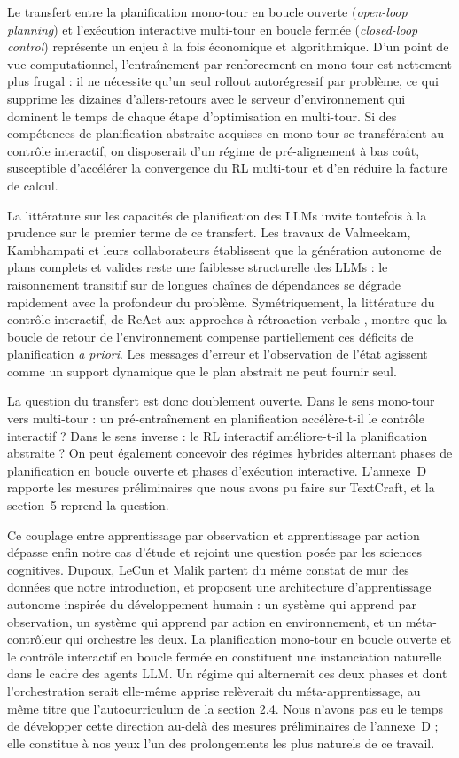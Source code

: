 \documentclass[11pt,a4paper]{article}
\begin{document}
Le transfert entre la planification mono-tour en boucle ouverte (\emph{open-loop planning}) et l'exécution interactive multi-tour en boucle fermée (\emph{closed-loop control}) représente un enjeu à la fois économique et algorithmique. D'un point de vue computationnel, l'entraînement par renforcement en mono-tour est nettement plus frugal : il ne nécessite qu'un seul rollout autorégressif par problème, ce qui supprime les dizaines d'allers-retours avec le serveur d'environnement qui dominent le temps de chaque étape d'optimisation en multi-tour. Si des compétences de planification abstraite acquises en mono-tour se transféraient au contrôle interactif, on disposerait d'un régime de pré-alignement à bas coût, susceptible d'accélérer la convergence du RL multi-tour et d'en réduire la facture de calcul.

La littérature sur les capacités de planification des LLMs invite toutefois à la prudence sur le premier terme de ce transfert. Les travaux de Valmeekam, Kambhampati et leurs collaborateurs \cite{valmeekam2023planning, kambhampati2024llmmodulo} établissent que la génération autonome de plans complets et valides reste une faiblesse structurelle des LLMs : le raisonnement transitif sur de longues chaînes de dépendances se dégrade rapidement avec la profondeur du problème. Symétriquement, la littérature du contrôle interactif, de ReAct \cite{yao2023react} aux approches à rétroaction verbale \cite{shinn2023reflexion}, montre que la boucle de retour de l'environnement compense partiellement ces déficits de planification \emph{a priori}. Les messages d'erreur et l'observation de l'état agissent comme un support dynamique que le plan abstrait ne peut fournir seul.

La question du transfert est donc doublement ouverte. Dans le sens mono-tour vers multi-tour : un pré-entraînement en planification accélère-t-il le contrôle interactif ? Dans le sens inverse : le RL interactif améliore-t-il la planification abstraite ? On peut également concevoir des régimes hybrides alternant phases de planification en boucle ouverte et phases d'exécution interactive. L'annexe~D rapporte les mesures préliminaires que nous avons pu faire sur TextCraft, et la section~5 reprend la question.


Ce couplage entre apprentissage par observation et apprentissage par action dépasse enfin notre cas d'étude et rejoint une question posée par les sciences cognitives. Dupoux, LeCun et Malik \cite{dupoux2026why} partent du même constat de mur des données que notre introduction, et proposent une architecture d'apprentissage autonome inspirée du développement humain : un système qui apprend par observation, un système qui apprend par action en environnement, et un méta-contrôleur qui orchestre les deux. La planification mono-tour en boucle ouverte et le contrôle interactif en boucle fermée en constituent une instanciation naturelle dans le cadre des agents LLM. Un régime qui alternerait ces deux phases et dont l'orchestration serait elle-même apprise relèverait du méta-apprentissage, au même titre que l'autocurriculum de la section 2.4. Nous n'avons pas eu le temps de développer cette direction au-delà des mesures préliminaires de l'annexe~D ; elle constitue à nos yeux l'un des prolongements les plus naturels de ce travail.
\end{document}
